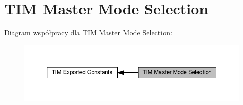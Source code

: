 \hypertarget{group___t_i_m___master___mode___selection}{}\section{T\+IM Master Mode Selection}
\label{group___t_i_m___master___mode___selection}
Diagram współpracy dla T\+IM Master Mode Selection\+:\nopagebreak
\begin{figure}[H]
\begin{center}
\leavevmode
\includegraphics[width=350pt]{group___t_i_m___master___mode___selection}
\end{center}
\end{figure}
